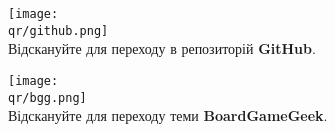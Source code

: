 \bigbreak

\begin{multicols}{2}
\centering
\texttt{[image: \\qr/github.png]}\\
Відскануйте для переходу в репозиторій \textbf{GitHub}.

\columnbreak

\texttt{[image: \\qr/bgg.png]}\\
Відскануйте для переходу теми \textbf{BoardGameGeek}.
\end{multicols}
